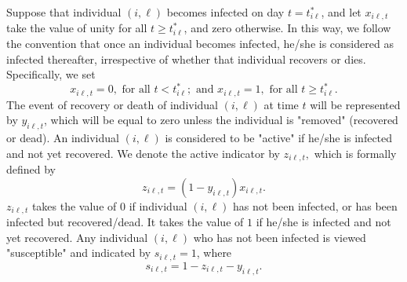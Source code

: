 \documentclass[12pt]{article}
\begin{document}
Suppose that individual $\left(  i,\ell\right)  $ becomes infected on day
$t=t_{i\ell}^{\ast}$, and let $x_{i\ell,t}$ take the value of unity for all
$t\geq t_{i\ell}^{\ast}$, and zero otherwise. In this way, we follow the
convention that once an individual becomes infected, he/she is considered as
infected thereafter, irrespective of whether that individual recovers or dies.
Specifically, we set%
\begin{equation}
x_{i\ell,t}=0,\text{ for all }t<t_{i\ell}^{\ast};\text{ \ and \ }x_{i\ell
,t}=1,\text{ for all }t\geq t_{i\ell}^{\ast}. \label{infected}%
\end{equation}
The event of recovery or death of individual $\left(  i,\ell\right)  $ at time
$t$ will be represented by $y_{i\ell,t}$, which will be equal to zero unless
the individual is "removed" (recovered or dead). An individual $(i,\ell)$ is
considered to be "active" if he/she is infected and not yet recovered. We
denote the active indicator by $z_{i\ell,t},$ which is formally defined by%
\begin{equation}
z_{i\ell,t}=\left(  1-y_{i\ell,t}\right)  x_{i\ell,t}. \label{active}%
\end{equation}
$z_{i\ell,t}$ takes the value of $0$ if individual $(i,\ell)$ has not been
infected, or has been infected but recovered/dead. It takes the value of $1$
if he/she is infected and not yet recovered. Any individual $(i,\ell)$ who has
not been infected is viewed "susceptible" and indicated by $s_{i\ell,t}=1$,
where%
\begin{equation}
s_{i\ell,t}=1-z_{i\ell,t}-y_{i\ell,t}. \label{susceptible}%
\end{equation}
\end{document}
